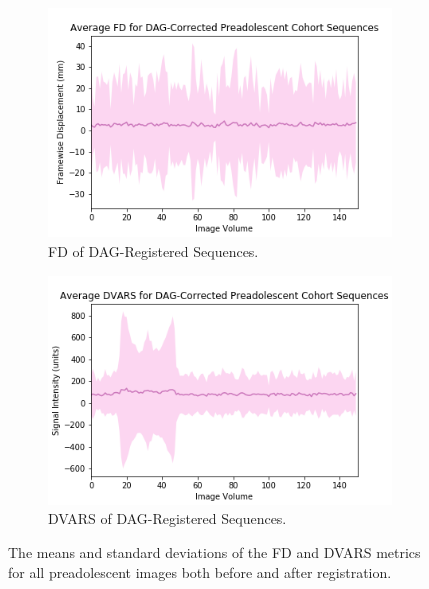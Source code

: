 \begin{figure}[t]
	\begin{subfigure}{0.4\textwidth}
		\centering
		\includegraphics[width=1.0\textwidth]{6/figures/preads-dag-fd-150.png}
		\caption{FD of DAG-Registered Sequences.}
	\end{subfigure}
	\hspace{0.05\textwidth}
	\begin{subfigure}{0.4\textwidth}
		\centering
		\includegraphics[width=1.0\textwidth]{6/figures/preads-dag-dvars-150.png}
		\caption{DVARS of DAG-Registered Sequences.}
	\end{subfigure}
\caption{The means and standard deviations of the FD and DVARS metrics for all preadolescent images both before and after registration.}
\label{fig:pread-power-dists}
\end{figure}


